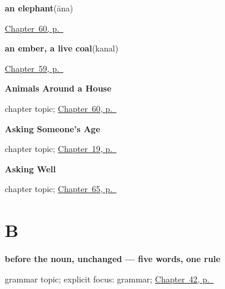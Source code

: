 \noindent\begin{minipage}[t]{\linewidth}
\raggedright
\textbf{an elephant}\enspace\emph{}\enspace(āna)\par
\footnotesize \hyperref[ch:ml-animals-around-a-house]{Chapter~60, p.~\pageref*{ch:ml-animals-around-a-house}}
\end{minipage}\par\smallskip

\noindent\begin{minipage}[t]{\linewidth}
\raggedright
\textbf{an ember, a live coal}\enspace\emph{}\enspace(kanal)\par
\footnotesize \hyperref[ch:ml-what-the-air-carries]{Chapter~59, p.~\pageref*{ch:ml-what-the-air-carries}}
\end{minipage}\par\smallskip

\noindent\begin{minipage}[t]{\linewidth}
\raggedright
\textbf{Animals Around a House}\par
\footnotesize chapter topic; \hyperref[ch:ml-animals-around-a-house]{Chapter~60, p.~\pageref*{ch:ml-animals-around-a-house}}
\end{minipage}\par\smallskip

\noindent\begin{minipage}[t]{\linewidth}
\raggedright
\textbf{Asking Someone's Age}\par
\footnotesize chapter topic; \hyperref[ch:ml-asking-age]{Chapter~19, p.~\pageref*{ch:ml-asking-age}}
\end{minipage}\par\smallskip

\noindent\begin{minipage}[t]{\linewidth}
\raggedright
\textbf{Asking Well}\par
\footnotesize chapter topic; \hyperref[ch:ml-asking-well]{Chapter~65, p.~\pageref*{ch:ml-asking-well}}
\end{minipage}\par\smallskip

\section*{B}

\noindent\begin{minipage}[t]{\linewidth}
\raggedright
\textbf{before the noun, unchanged — five words, one rule}\par
\footnotesize grammar topic; explicit focus: grammar; \hyperref[ch:ml-describing-things]{Chapter~42, p.~\pageref*{ch:ml-describing-things}}
\end{minipage}\par\smallskip

